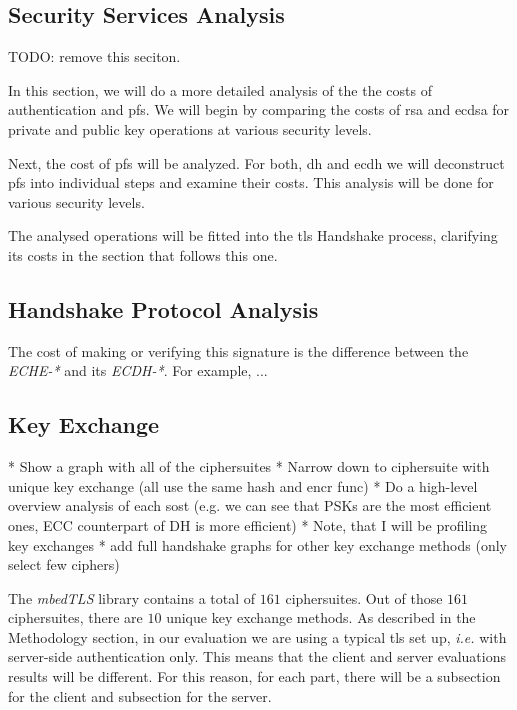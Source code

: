 \documentclass{llncs}
\begin{document}
\subsection{Security Services Analysis}

TODO: remove this seciton.

In this section, we will do a more detailed analysis of the the costs of authentication and \gls{pfs}.
We will begin by comparing the costs of \gls{rsa} and \gls{ecdsa} for private and public key operations at various
security levels. 

Next, the cost of \gls{pfs} will be analyzed. For both, \gls{dh} and \gls{ecdh} we will deconstruct \gls{pfs} into 
individual steps and examine their costs. This analysis will be done for various security levels. 

The analysed operations will be fitted into the \gls{tls} Handshake process, clarifying its costs in the section that
follows this one.




\subsection{Handshake Protocol Analysis}

The cost of making or verifying this signature is the difference between the \textit{ECHE-*} and its \textit{ECDH-*}.
For example, ...


\subsection{Key Exchange} 
 * Show a graph with all of the ciphersuites
* Narrow down to ciphersuite with unique key exchange (all use the same hash and encr func)
* Do a high-level overview analysis of each sost (e.g. we can see that PSKs are the most efficient ones,
ECC counterpart of DH is more efficient)
* Note, that  I will be profiling key exchanges
* add full handshake graphs for other key exchange methods (only select few ciphers)

The \textit{mbedTLS} library contains a total of $161$ ciphersuites. Out of those $161$ ciphersuites, there are
$10$ unique key exchange methods. As described in the Methodology section, in our evaluation we are using a typical \gls{tls} set up,
\textit{i.e.} with server-side authentication only. This means that the client and server evaluations results will be different.
For this reason, for each part, there will be a subsection for the client and subsection for the server. 
\end{document}
